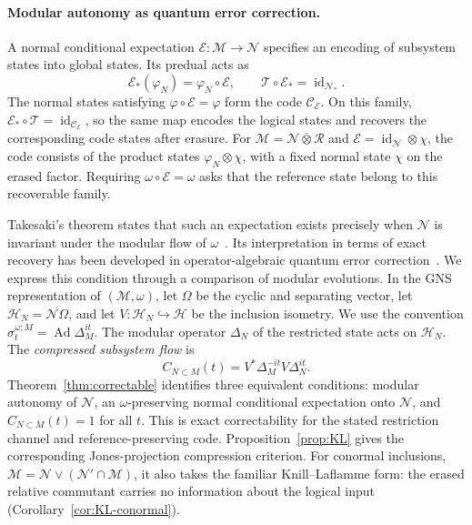 \documentclass[a4paper,11pt]{article}
\theoremstyle{definition}
\begin{document}
\paragraph{Modular autonomy as quantum error correction.}
A normal conditional expectation $\mathcal E:\mathcal M\to\mathcal N$ specifies an encoding of subsystem states into global states. Its predual acts as
\begin{equation}
 \mathcal E_*(\varphi_N)=\varphi_N\circ\mathcal E,
 \qquad
 \mathcal T\circ\mathcal E_*=\operatorname{id}_{\mathcal N_*}.
\end{equation}
The normal states satisfying $\varphi\circ\mathcal E=\varphi$ form the code $\mathcal C_{\mathcal E}$. On this family, $\mathcal E_*\circ\mathcal T=\operatorname{id}_{\mathcal C_{\mathcal E}}$, so the same map encodes the logical states and recovers the corresponding code states after erasure. For $\mathcal M=\mathcal N\overline\otimes\mathcal R$ and $\mathcal E=\operatorname{id}_{\mathcal N}\otimes\chi$, the code consists of the product states $\varphi_N\otimes\chi$, with a fixed normal state $\chi$ on the erased factor. Requiring $\omega\circ\mathcal E=\omega$ asks that the reference state belong to this recoverable family.

Takesaki's theorem states that such an expectation exists precisely when $\mathcal N$ is invariant under the modular flow of $\omega$~\cite{Takesaki1972}. Its interpretation in terms of exact recovery has been developed in operator-algebraic quantum error correction~\cite{Faulkner2020}. We express this condition through a comparison of modular evolutions. In the GNS representation of $(\mathcal M,\omega)$, let $\Omega$ be the cyclic and separating vector, let $\mathcal H_N=\overline{\mathcal N\Omega}$, and let $V:\mathcal H_N\hookrightarrow\mathcal H$ be the inclusion isometry. We use the convention $\sigma_t^{\omega;M}=\operatorname{Ad}\Delta_M^{it}$. The modular operator $\Delta_N$ of the restricted state acts on $\mathcal H_N$. The \emph{compressed subsystem flow} is
\begin{equation}
 C_{N\subset M}(t)=V^*\Delta_M^{-it}V\Delta_N^{it}.
\end{equation}
Theorem~\ref{thm:correctable} identifies three equivalent conditions: modular autonomy of $\mathcal N$, an $\omega$-preserving normal conditional expectation onto $\mathcal N$, and $C_{N\subset M}(t)=1$ for all $t$. This is exact correctability for the stated restriction channel and reference-preserving code. Proposition~\ref{prop:KL} gives the corresponding Jones-projection compression criterion. For conormal inclusions, $\mathcal M=\mathcal N\vee(\mathcal N'\cap\mathcal M)$, it also takes the familiar Knill--Laflamme form: the erased relative commutant carries no information about the logical input (Corollary~\ref{cor:KL-conormal}).
\end{document}
